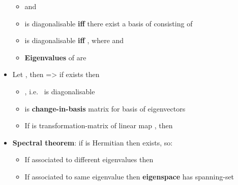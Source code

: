 \begin{itemize}
  \begin{itemize}
  
  \item
     and
  \item
     is diagonalisable \textbf{iff} there exist a basis of
     consisting of
  \item
     is diagonalisable \textbf{iff} ,
    where 
    and 
  \item
    \textbf{Eigenvalues} of  are
  \end{itemize}
\item
  Let , then
  =\textgreater{} if  exists then

  \begin{itemize}
  
  \item
    , i.e.~ is diagonalisable
  \item
     is \textbf{change-in-basis} matrix for
    basis
     of
    eigenvectors
  \item
    If  is transformation-matrix of linear
    map , then
  \end{itemize}
\item
  \textbf{Spectral theorem}: if  is Hermitian then
   exists, so:

  \begin{itemize}
  
  \item
    If  associated to different
    eigenvalues then 
  \item
    If associated to same eigenvalue \iMbox{\lambda} then
    \textbf{eigenspace}  has spanning-set


\end{itemize}
\end{itemize}
